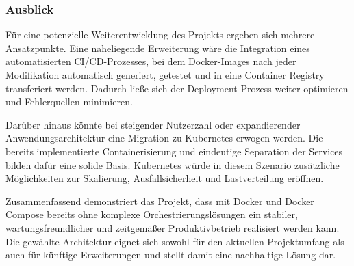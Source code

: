 \subsubsection{Ausblick}

Für eine potenzielle Weiterentwicklung des Projekts ergeben sich mehrere
Ansatzpunkte. Eine naheliegende Erweiterung wäre die Integration eines
automatisierten CI/CD-Prozesses, bei dem Docker-Images nach jeder Modifikation
automatisch generiert, getestet und in eine Container Registry transferiert werden.
Dadurch ließe sich der Deployment-Prozess weiter optimieren und Fehlerquellen
minimieren.

Darüber hinaus könnte bei steigender Nutzerzahl oder expandierender
Anwendungsarchitektur eine Migration zu Kubernetes erwogen werden. Die bereits
implementierte Containerisierung und eindeutige Separation der Services bilden
dafür eine solide Basis. Kubernetes würde in diesem Szenario zusätzliche
Möglichkeiten zur Skalierung, Ausfallsicherheit und Lastverteilung eröffnen.

Zusammenfassend demonstriert das Projekt, dass mit Docker und Docker Compose
bereits ohne komplexe Orchestrierungslösungen ein stabiler, wartungsfreundlicher
und zeitgemäßer Produktivbetrieb realisiert werden kann. Die gewählte Architektur
eignet sich sowohl für den aktuellen Projektumfang als auch für künftige
Erweiterungen und stellt damit eine nachhaltige Lösung dar.